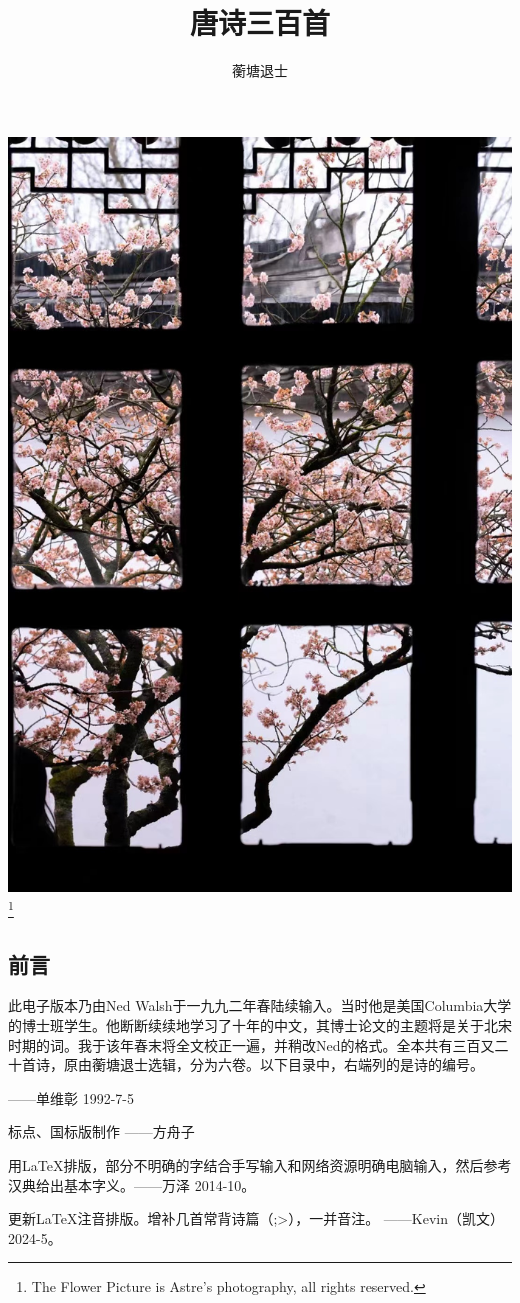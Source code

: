 \documentclass[12pt,oneside,a5paper]{book}
\begin{document}
\frontmatter

\title{唐诗三百首}
\author{蘅塘退士}
\maketitle

\begin{center}
    \includegraphics[width=.5\textwidth,height=.5\textheight,keepaspectratio]{题照拙句.jpg}\footnote[0]{The Flower Picture is Astre's photography, all rights reserved.}
\end{center}

\begin{common-format}
\chapter*{前言}

此电子版本乃由Ned Walsh于一九九二年春陆续输入。当时他是美国Columbia大学的博士班学生。他断断续续地学习了十年的中文，其博士论文的主题将是关于北宋时期的词。我于该年春末将全文校正一遍，并稍改Ned的格式。全本共有三百又二十首诗，原由蘅塘退士选辑，分为六卷。以下目录中，右端列的是诗的编号。

——单维彰 1992-7-5

标点、国标版制作 ——方舟子

用\LaTeX 排版，部分不明确的字结合手写输入和网络资源明确电脑输入，然后参考汉典给出基本字义。——万泽 2014-10。

更新\LaTeX 注音排版。增补几首常背诗篇（;>），一并音注。 ——Kevin（凯文） 2024-5。


\end{common-format}
\end{document}

